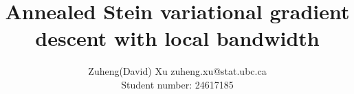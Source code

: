 \documentclass[11pt]{article}
\begin{document}
\title{Annealed Stein variational gradient descent with local bandwidth}

\author{\name Zuheng(David) Xu \email zuheng.xu@stat.ubc.ca \\
       \addr Student number: 24617185\\}      


\maketitle





% 




\newpage




\newpage
\appendix

\end{document}
